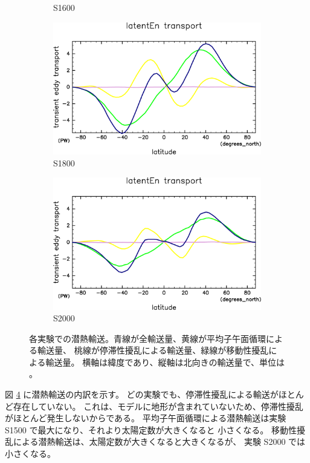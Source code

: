 \documentclass[body]{subfiles}
\begin{document}
\begin{figure}[t]
\begin{subfigure}{.4\textwidth}
		\caption{S1600}\label{潜熱S1600}
	\end{subfigure}
	\begin{subfigure}{.4\textwidth}
		\centering
		\includegraphics[width=\columnwidth]{S1800/MeriHeatTrans@latentEn,time=3650:4015-crop-rotate.pdf}
		\caption{S1800}\label{潜熱S1800}
	\end{subfigure}
	\begin{subfigure}{.4\textwidth}
		\centering
		\includegraphics[width=\columnwidth]{S2000/MeriHeatTrans@latentEn,time=7300:7665-crop-rotate.pdf}
		\caption{S2000}\label{潜熱S2000}
	\end{subfigure}
	\caption[各実験での潜熱輸送の内訳]{
		各実験での潜熱輸送。青線が全輸送量、黄線が平均子午面循環による輸送量、
		桃線が停滞性擾乱による輸送量、緑線が移動性擾乱による輸送量。
		横軸は緯度であり、縦軸は北向きの輸送量で、単位は 。
	}\label{潜熱}
\end{figure}

図 \ref{潜熱} に潜熱輸送の内訳を示す。
どの実験でも、停滞性擾乱による輸送がほとんど存在していない。
これは、モデルに地形が含まれていないため、停滞性擾乱がほとんど発生しないからである。
平均子午面循環による潜熱輸送は実験 S1500 で最大になり、それより太陽定数が大きくなると
小さくなる。
移動性擾乱による潜熱輸送は、太陽定数が大きくなると大きくなるが、
実験 S2000 では小さくなる。
\end{document}
